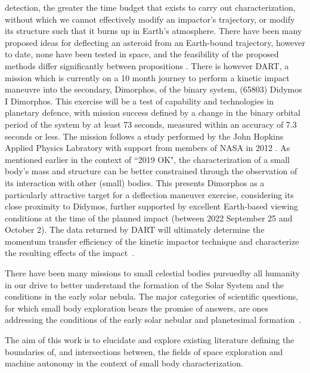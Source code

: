 detection, the greater the time budget that exists to carry out
characterization, without which we cannot effectively modify an impactor's
trajectory, or modify its structure such that it burns up in Earth's atmosphere.
There have been many proposed ideas for deflecting an asteroid from an
Earth-bound trajectory, however to date, none have been tested in space, and the
feasibility of the proposed methods differ significantly between propositions
\cite{Harris2015}. There is however  \gls{DART}, a mission which
is currently on a 10 month journey to perform a kinetic impact maneuvre into the
secondary, Dimorphos, of the binary system, (65803) Didymos I Dimorphos. This
exercise will be a test of  capability and technologies in
planetary defence, with mission success defined by a change in the binary
orbital period of the system by at least 73 seconds, measured within an accuracy
of 7.3 seconds or less. The mission follows a study performed by the John
Hopkins Applied Physics Labratory with support from members of \gls{NASA} in
2012 \cite{Cheng2012}. As mentioned earlier in the context of ``2019 OK", the
characterization of a small body's mass and structure can be better constrained
through the observation of its interaction with other (small) bodies. This
presents Dimorphos as a particularly attractive target for a deflection maneuver
exercise, considering its close proximity to Didymos, further supported by
excellent Earth-based viewing conditions at the time of the planned impact
(between 2022 September 25 and October 2). The data returned by \gls{DART} will
ultimately determine the momentum transfer efficiency of the kinetic impactor
technique and characterize the resulting effects of the impact~\cite{Cheng2012,
Rivkin2021}.

There have been many missions to small celestial bodies pursuedby all humanity
in our drive to better understand the formation of the Solar System and the
conditions in the early solar nebula.  The major categories of scientific questions, for which small
body exploration bears the promise of answers, are ones addressing the
conditions of the early solar nebular and planetesimal
formation~\cite{Davidsson2021}.


The aim of this work is to elucidate and explore
existing literature defining the boundaries of, and intersections between, the
fields of space exploration and machine autonomy in the context of small body
characterization.




\cite{Rivkin2021}

